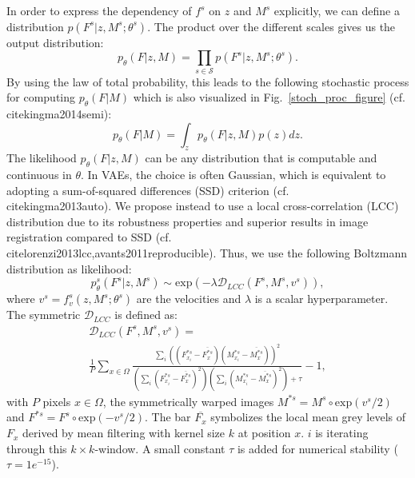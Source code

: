 \documentclass[journal]{IEEEtran}
\begin{document}
In order to express the dependency of $f^s$ on $z$ and $M^s$  explicitly, we can define a distribution $p(F^s | z,M^s;\theta^s)$. The product over the different scales gives us the output distribution: 
\begin{equation}\label{outputdist}
p_\theta(F | z,M) = \prod_{s\in \mathcal{S}} p(F^s | z,M^s;\theta^s).
\end{equation}
By using the law of total probability, this leads to the following stochastic process for computing $p_\theta(F|M)$ which is also visualized in Fig.~\ref{stoch_proc_figure} (cf.\\cite{kingma2014semi}):
\begin{equation}\label{stochPrc}
p_\theta(F|M) = \int_z p_\theta(F | z,M) p(z) dz.
\end{equation}
The likelihood $p_\theta(F | z,M)$ can be any distribution that is computable and continuous in $\theta$. In VAEs, the choice is often Gaussian, which is equivalent to adopting a sum-of-squared differences (SSD) criterion (cf.\\cite{kingma2013auto}). We propose instead to use a local cross-correlation (LCC) distribution due to its robustness properties and superior results in image registration compared to SSD (cf.\\cite{lorenzi2013lcc,avants2011reproducible}). Thus, we use the following Boltzmann distribution as likelihood:
\begin{equation}\label{lcc}
p_\theta^{s}(F^s | z,M^s) \sim \text{exp}(-\lambda \mathcal{D}_{LCC}(F^s,M^s,v^s)),
\end{equation}
where $v^s=f^s_{v}(z, M^s; \theta^s)$ are the velocities and $\lambda$ is a scalar hyperparameter. The symmetric $\mathcal{D}_{LCC}$ is defined as: 
\begin{multline}\label{normLCCDef}
\mathcal{D}_\textit{LCC}(F^s,M^s,v^s) = \\ \frac{1}{P} \sum_{x \in \Omega}  \frac{\sum_i \left(\left(F^{*s}_{x_i} - \overline{F^{*s}_x}\right)\left(M^{*s}_{x_i} - \overline{M^{*s}_x}\right)\right)^2}{\left(\sum_i \left(F^{*s}_{x_i} - \overline{F^{*s}_x}\right)^2\right) \left(\sum_i \left(M^{*s}_{x_i} - \overline{M^{*s}_x}\right)^2\right) + \tau} - 1,
\end{multline}
with $P$ pixels $x\in \Omega$, the symmetrically warped images $M^{*s}=M^s\circ \text{exp}\left(v^s/2\right)$ and $F^{*s}=F^s\circ \text{exp}\left(-v^s/2\right)$. The bar $\overline{F_x}$ symbolizes the local mean grey levels of $F_x$ derived by mean filtering with kernel size $k$ at position $x$. $i$ is iterating through this $k\times k$-window. A small constant $\tau$ is added for numerical stability ($\tau=1e^{-15}$). 
\end{document}
